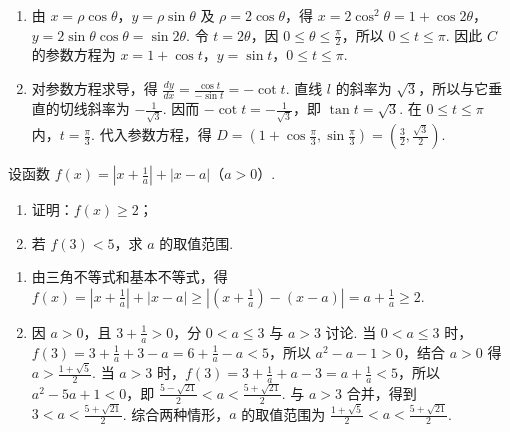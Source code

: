 \begin{solution}
\begin{enumerate}
\item 由 \(x=\rho\cos\theta\)，\(y=\rho\sin\theta\) 及 \(\rho=2\cos\theta\)，得 \(x=2\cos^2\theta=1+\cos2\theta\)，\(y=2\sin\theta\cos\theta=\sin2\theta\). 令 \(t=2\theta\)，因 \(0\leqslant\theta\leqslant\frac{\pi}{2}\)，所以 \(0\leqslant t\leqslant\pi\). 因此 \(C\) 的参数方程为 \(x=1+\cos t\)，\(y=\sin t\)，\(0\leqslant t\leqslant\pi\).
\item 对参数方程求导，得 \(\frac{dy}{dx}=\frac{\cos t}{-\sin t}=-\cot t\). 直线 \(l\) 的斜率为 \(\sqrt3\)，所以与它垂直的切线斜率为 \(-\frac1{\sqrt3}\). 因而 \(-\cot t=-\frac1{\sqrt3}\)，即 \(\tan t=\sqrt3\). 在 \(0\leqslant t\leqslant\pi\) 内，\(t=\frac{\pi}{3}\). 代入参数方程，得 \(D=(1+\cos\frac{\pi}{3},\sin\frac{\pi}{3})=(\frac32,\frac{\sqrt3}{2})\).
\end{enumerate}
\end{solution}

\begin{problem}
设函数 \(f(x)=\left|x+\frac{1}{a}\right|+\left|x-a\right|\)（\(a>0\)）.
\begin{enumerate}
\item 证明：\(f(x)\geqslant 2\)；
\item 若 \(f(3)<5\)，求 \(a\) 的取值范围.
\end{enumerate}
\end{problem}

\begin{solution}
\begin{enumerate}
\item 由三角不等式和基本不等式，得
\(f(x)=\left|x+\frac1a\right|+|x-a|\geqslant\left|\left(x+\frac1a\right)-(x-a)\right|=a+\frac1a\geqslant2\).
\item 因 \(a>0\)，且 \(3+\frac1a>0\)，分 \(0<a\leqslant3\) 与 \(a>3\) 讨论.
当 \(0<a\leqslant3\) 时，\(f(3)=3+\frac1a+3-a=6+\frac1a-a<5\)，所以 \(a^2-a-1>0\)，结合 \(a>0\) 得 \(a>\frac{1+\sqrt5}{2}\).
当 \(a>3\) 时，\(f(3)=3+\frac1a+a-3=a+\frac1a<5\)，所以 \(a^2-5a+1<0\)，即 \(\frac{5-\sqrt{21}}2<a<\frac{5+\sqrt{21}}2\). 与 \(a>3\) 合并，得到 \(3<a<\frac{5+\sqrt{21}}2\).
综合两种情形，\(a\) 的取值范围为 \(\displaystyle\frac{1+\sqrt5}{2}<a<\frac{5+\sqrt{21}}2\).
\end{enumerate}
\end{solution}

